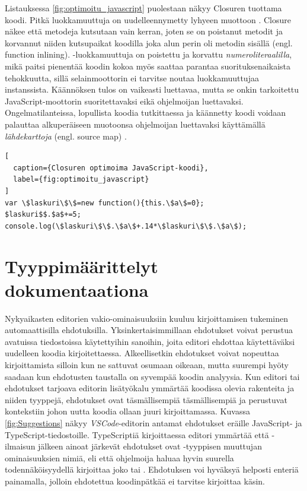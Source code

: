 Listauksessa \ref{fig:optimoitu_javascript} puolestaan näkyy Closuren
tuottama koodi. Pitkä luokkamuuttuja 
on uudelleennymetty lyhyeen muottoon . Closure näkee
että metodeja kutsutaan vain kerran, joten se on poistanut metodit ja
korvannut niiden kutsupaikat koodilla joka alun perin oli metodin sisällä
(engl. function inlining). -luokkamuuttuja
on poistettu ja korvattu  \textit{numeroliteraalilla},
mikä paitsi pienentää koodin kokoa myös saattaa parantaa suorituksenaikaista
tehokkuutta, sillä selainmoottorin ei tarvitse noutaa 
luokkamuuttujaa instanssista. Käännöksen tulos on vaikeasti luettavaa, mutta
se onkin tarkoitettu JavaScript-moottorin suoritettavaksi eikä ohjelmoijan
luettavaksi. Ongelmatilanteissa, lopullista koodia tutkittaessa ja
 käännetty koodi voidaan palauttaa alkuperäiseen
muotoonsa ohjelmoijan luettavaksi käyttämällä \textit{lähdekarttoja}
(engl. source map) \cite{SourceMapMDN, SourceMapsDocsClosure}.

\begin{lstlisting}[
  caption={Closuren optimoima JavaScript-koodi},
  label={fig:optimoitu_javascript}
]
var \$laskuri\$\$=new function(){this.\$a\$=0};
$laskuri$$.$a$+=5;
console.log(\$laskuri\$\$.\$a\$+.14*\$laskuri\$\$.\$a\$);
\end{lstlisting}

\section{Tyyppimäärittelyt dokumentaationa}
Nykyaikasten editorien vakio-ominaisuuksiin kuuluu kirjoittamisen tukeminen
automaattisilla ehdotuksilla. Yksinkertaisimmillaan ehdotukset voivat
perustua avatuissa tiedostoissa käytettyihin sanoihin, joita editori ehdottaa
käytettäväksi uudelleen koodia kirjoitettaessa. Alkeellisetkin ehdotukset
voivat nopeuttaa kirjoittamista silloin kun ne sattuvat osumaan oikeaan,
mutta suurempi hyöty saadaan kun ehdotusten taustalla on syvempää koodin
analyysia. Kun editori tai ehdotukset tarjoava editorin lisätyökalu ymmärtää
koodissa olevia rakenteita ja niiden tyyppejä, ehdotukset ovat täsmällisempiä
täsmällisempiä ja perustuvat kontekstiin johon uutta koodia ollaan juuri
kirjoittamassa. Kuvassa \ref{fig:Suggestions} näkyy\newline
\textit{VSCode}-editorin antamat ehdotukset eräille JavaScript-
ja TypeScript-tiedostoille.\newline
TypeScriptiä kirjoittaessa editori ymmärtää että -ilmaisun
jälkeen ainoat järkevät ehdotukset ovat -tyyppisen muuttujan
ominaisuuksien nimiä, eli että ohjelmoija haluaa hyvin suurella todennäköisyydellä
kirjoittaa joko  tai .
Ehdotuksen voi hyväksyä helposti enteriä painamalla, jolloin ehdotettua
koodinpätkää ei tarvitse kirjoittaa käsin.

